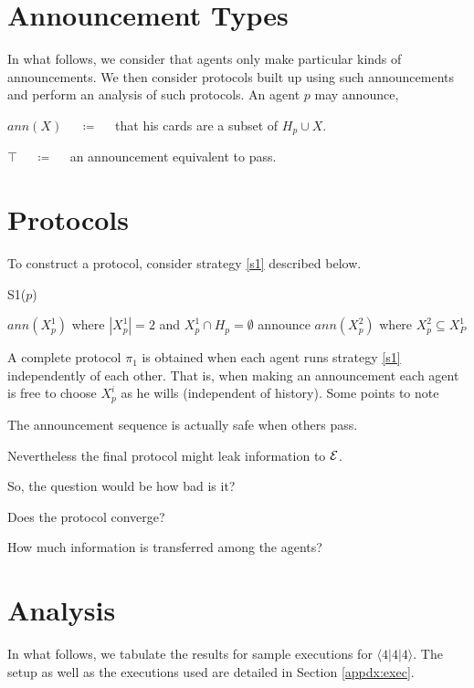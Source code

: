 \documentclass{article}
\begin{document}
\section{Announcement Types}

In what follows, we consider that agents
only make particular kinds of announcements.
We then consider protocols built up using such
announcements and perform an analysis of such
protocols. An agent $p$ may announce,
\begin{compactenum}
\item $ann(X)$ $\quad \coloneq \quad$ that his cards are a subset of $H_p \cup X$.
\item $\top$ $\quad \coloneq \quad$ an announcement equivalent to pass.
\end{compactenum}

\section{Protocols}

To construct a protocol, consider 
strategy \ref{s1} described below.

\begin{algorithm}
\caption{S1($p$)}
\label{s1}
\begin{algorithmic}[1]
\STATE $ann(X_{p}^1)$ where $|X_p^1| = 2$ and $X_p^1 \cap H_p = \emptyset$ 
\STATE announce $ann(X_p^2)$ where $X_p^2 \subseteq X_P^1$
\end{algorithmic}
\end{algorithm}

A complete protocol $\pi_1$ is obtained when each agent
runs strategy \ref{s1} independently of each other. That
is, when making an announcement each agent is free to
choose $X_p^i$ as he wills (independent of history). 
Some points to note

\begin{compactenum}[\label=a)]
\item The announcement sequence is actually safe when others pass.
\item Nevertheless the final protocol might leak information to $\cal E$.
\item So, the question would be how bad is it? 
\item Does the protocol converge?
\item How much information is transferred among the agents?
\end{compactenum}

\section{Analysis}
In what follows, we tabulate the results for
sample executions for $\langle 4 | 4 | 4 \rangle$.
The setup as well as the executions used are detailed 
in Section \ref{appdx:exec}.
\end{document}
